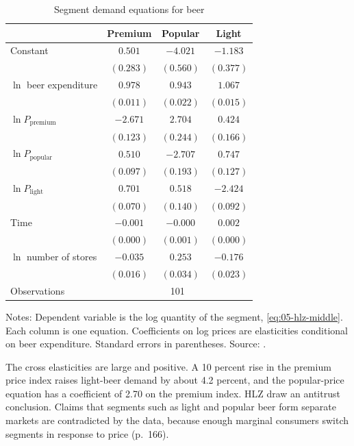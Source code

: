 \begin{table}[htbp]
\centering
\caption{Segment demand equations for beer}\label{tab:05-hlz-table1}
\begin{threeparttable}
\begin{tabular}{@{}lccc@{}}
\toprule
 & Premium & Popular & Light \\
\midrule
Constant & $0.501$ & $-4.021$ & $-1.183$ \\
 & $(0.283)$ & $(0.560)$ & $(0.377)$ \\
$\ln$ beer expenditure & $0.978$ & $0.943$ & $1.067$ \\
 & $(0.011)$ & $(0.022)$ & $(0.015)$ \\
$\ln P_{\text{premium}}$ & $-2.671$ & $2.704$ & $0.424$ \\
 & $(0.123)$ & $(0.244)$ & $(0.166)$ \\
$\ln P_{\text{popular}}$ & $0.510$ & $-2.707$ & $0.747$ \\
 & $(0.097)$ & $(0.193)$ & $(0.127)$ \\
$\ln P_{\text{light}}$ & $0.701$ & $0.518$ & $-2.424$ \\
 & $(0.070)$ & $(0.140)$ & $(0.092)$ \\
Time & $-0.001$ & $-0.000$ & $0.002$ \\
 & $(0.000)$ & $(0.001)$ & $(0.000)$ \\
$\ln$ number of stores & $-0.035$ & $0.253$ & $-0.176$ \\
 & $(0.016)$ & $(0.034)$ & $(0.023)$ \\
\midrule
Observations & \multicolumn{3}{c}{101} \\
\bottomrule
\end{tabular}
\begin{tablenotes}[flushleft]\footnotesize
\item Notes: Dependent variable is the log quantity of the segment, \eqref{eq:05-hlz-middle}. Each column is one
equation. Coefficients on log prices are elasticities conditional on beer expenditure. Standard errors in
parentheses. Source: \citet[Table 1]{HausmanLeonardZona1994}.
\end{tablenotes}
\end{threeparttable}
\end{table}

The cross elasticities are large and positive. A 10 percent rise in the premium price index raises light-beer
demand by about 4.2 percent, and the popular-price equation has a coefficient of 2.70 on the premium index. HLZ
draw an antitrust conclusion. Claims that segments such as light and popular beer form separate markets are
contradicted by the data, because enough marginal consumers switch segments in response to price (p.~166).


